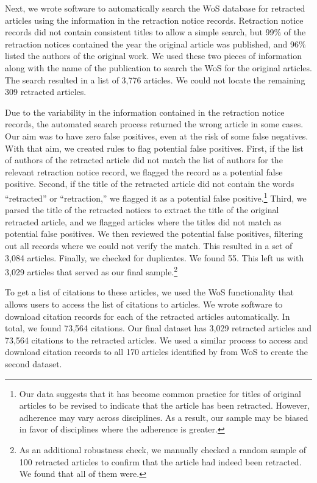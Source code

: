 \documentclass[12pt, letterpaper]{article}
\begin{document}
Next, we wrote software to automatically search the WoS database for retracted articles using the information in the retraction notice records. Retraction notice records did not contain consistent titles to allow a simple search, but 99\% of the retraction notices contained the year the original article was published, and 96\% listed the authors of the original work. We used these two pieces of information along with the name of the publication to search the WoS for the original articles. The search resulted in a list of 3,776 articles. We could not locate the remaining 309 retracted articles.

Due to the variability in the information contained in the retraction notice records, the automated search process returned the wrong article in some cases. Our aim was to have zero false positives, even at the risk of some false negatives. With that aim, we created rules to flag potential false positives. First, if the list of authors of the retracted article did not match the list of authors for the relevant retraction notice record, we flagged the record as a potential false positive. Second, if the title of the retracted article did not contain the words ``retracted'' or ``retraction,'' we flagged it as a potential false positive.\footnote{Our data suggests that it has become common practice for titles of original articles to be revised to indicate that the article has been retracted. However, adherence may vary across disciplines. As a result, our sample may be biased in favor of disciplines where the adherence is greater.} Third, we parsed the title of the retracted notices to extract the title of the original retracted article, and we flagged articles where the titles did not match as potential false positives. We then reviewed the potential false positives, filtering out all records where we could not verify the match. This resulted in a set of 3,084 articles. Finally, we checked for duplicates. We found 55. This left us with 3,029 articles that served as our final sample.\footnote{As an additional robustness check, we manually checked a random sample of 100 retracted articles to confirm that the article had indeed been retracted. We found that all of them were.}

To get a list of citations to these articles, we used the WoS functionality that allows users to access the list of citations to articles. We wrote software to download citation records for each of the retracted articles automatically. In total, we found 73,564 citations. Our final dataset has 3,029 retracted articles and 73,564 citations to the retracted articles. We used a similar process to access and download citation records to all 170 articles identified by \citet{nieuwenhuis2011} from WoS to create the second dataset.
\end{document}
